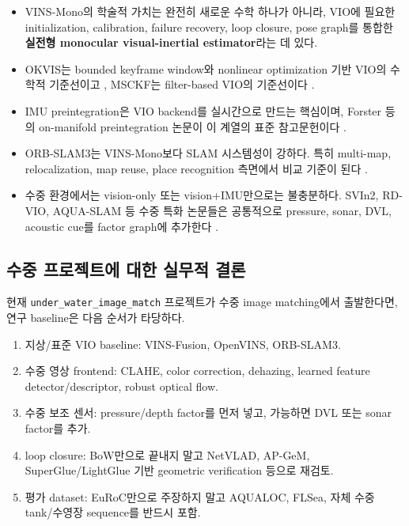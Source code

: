 \documentclass[11pt,a4paper]{article}
\newcommand{\code}[1]{\texttt{#1}}
\begin{document}
\begin{itemize}
  \item VINS-Mono의 학술적 가치는 완전히 새로운 수학 하나가 아니라, VIO에 필요한 initialization, calibration, failure recovery, loop closure, pose graph를 통합한 \textbf{실전형 monocular visual-inertial estimator}라는 데 있다.
  \item OKVIS는 bounded keyframe window와 nonlinear optimization 기반 VIO의 수학적 기준선이고 \cite{leutenegger2015okvis}, MSCKF는 filter-based VIO의 기준선이다 \cite{mourikis2007msckf}.
  \item IMU preintegration은 VIO backend를 실시간으로 만드는 핵심이며, Forster 등의 on-manifold preintegration 논문이 이 계열의 표준 참고문헌이다 \cite{forster2017preintegration}.
  \item ORB-SLAM3는 VINS-Mono보다 SLAM 시스템성이 강하다. 특히 multi-map, relocalization, map reuse, place recognition 측면에서 비교 기준이 된다 \cite{campos2021orbslam3}.
  \item 수중 환경에서는 vision-only 또는 vision+IMU만으로는 불충분하다. SVIn2, RD-VIO, AQUA-SLAM 등 수중 특화 논문들은 공통적으로 pressure, sonar, DVL, acoustic cue를 factor graph에 추가한다 \cite{rahman2022svin2,li2023rdvio,xu2025aquaslam}.
\end{itemize}

\subsection{수중 프로젝트에 대한 실무적 결론}

현재 \code{under\_water\_image\_match} 프로젝트가 수중 image matching에서 출발한다면, 연구 baseline은 다음 순서가 타당하다.

\begin{enumerate}
  \item 지상/표준 VIO baseline: VINS-Fusion, OpenVINS, ORB-SLAM3.
  \item 수중 영상 frontend: CLAHE, color correction, dehazing, learned feature detector/descriptor, robust optical flow.
  \item 수중 보조 센서: pressure/depth factor를 먼저 넣고, 가능하면 DVL 또는 sonar factor를 추가.
  \item loop closure: BoW만으로 끝내지 말고 NetVLAD, AP-GeM, SuperGlue/LightGlue 기반 geometric verification 등으로 재검토.
  \item 평가 dataset: EuRoC만으로 주장하지 말고 AQUALOC, FLSea, 자체 수중 tank/수영장 sequence를 반드시 포함.
\end{enumerate}
\end{document}
